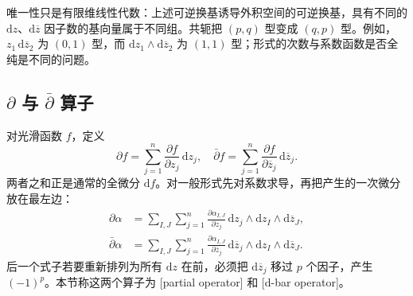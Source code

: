 唯一性只是有限维线性代数：上述可逆换基诱导外积空间的可逆换基，具有不同的 \(\mathrm dz\)、\(\mathrm d\overline z\) 因子数的基向量属于不同组。共轭把 \((p,q)\) 型变成 \((q,p)\) 型。例如，\(z_1\,\mathrm d\overline z_2\) 为 \((0,1)\) 型，而
\(\mathrm dz_1\wedge\mathrm d\overline z_2\) 为 \((1,1)\) 型；形式的次数与系数函数是否全纯是不同的问题。

\subsection{\texorpdfstring{\(\partial\)}{∂} 与 \texorpdfstring{\(\bar\partial\)}{dbar} 算子}
\label{b3:subsec:290502}

对光滑函数 \(f\)，定义
\[
 \partial f=\sum_{j=1}^n\frac{\partial f}{\partial z_j}\,\mathrm dz_j,
 \quad
 \bar\partial f=\sum_{j=1}^n\frac{\partial f}{\partial\overline z_j}\,
      \mathrm d\overline z_j.
\]
两者之和正是通常的全微分 \(\mathrm df\)。对一般形式先对系数求导，再把产生的一次微分放在最左边：
\begin{align*}
 \partial\alpha
 &=\sum_{I,J}\sum_{j=1}^n
   \frac{\partial\alpha_{I,J}}{\partial z_j}\,
   \mathrm dz_j\wedge\mathrm dz_I\wedge\mathrm d\overline z_J,\\
 \bar\partial\alpha
 &=\sum_{I,J}\sum_{j=1}^n
   \frac{\partial\alpha_{I,J}}{\partial\overline z_j}\,
   \mathrm d\overline z_j\wedge\mathrm dz_I\wedge\mathrm d\overline z_J.
\end{align*}
后一个式子若要重新排列为所有 \(\mathrm dz\) 在前，必须把 \(\mathrm d\overline z_j\) 移过 \(p\) 个因子，产生 \((-1)^p\)。本节称这两个算子为 [partial operator] 和 [d-bar operator]。

